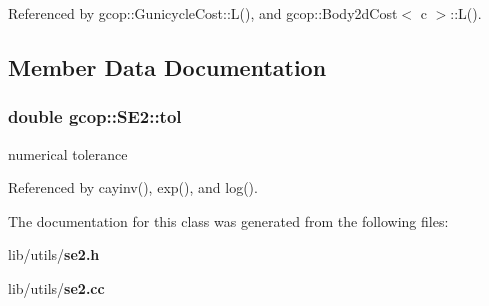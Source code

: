 \-Referenced by gcop\-::\-Gunicycle\-Cost\-::\-L(), and gcop\-::\-Body2d\-Cost$<$ c $>$\-::\-L().



\subsection{\-Member \-Data \-Documentation}
\subsubsection[{tol}]{\setlength{\rightskip}{0pt plus 5cm}double {\bf gcop\-::\-S\-E2\-::tol}}\label{classgcop_1_1SE2_a20743c73439f6aca32536534e012a11a}


numerical tolerance 



\-Referenced by cayinv(), exp(), and log().



\-The documentation for this class was generated from the following files\-:\begin{DoxyCompactItemize}
\item 
lib/utils/{\bf se2.\-h}\item 
lib/utils/{\bf se2.\-cc}\end{DoxyCompactItemize}
